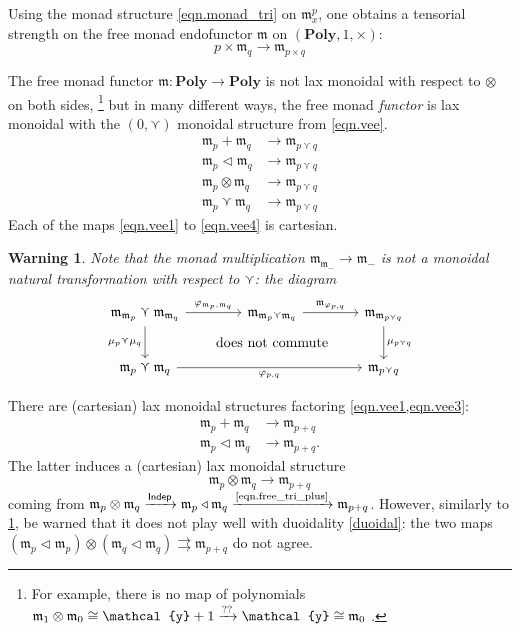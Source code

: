 \documentclass[11pt, one side, article]{memoir}
\theoremstyle{definition}
\theoremstyle{plain}
\newtheorem{warning}[definitionx]{Warning}
\newcommand{\Cat}[1]{\mathbf{#1}}%
\newcommand{\Fun}[1]{\mathsf{#1}}%
\newcommand{\tto}{\rightrightarrows}
\newcommand{\To}[2][]{\xrightarrow[#1]{\tn{$#2$}}}
\newcommand{\tn}[1]{\textnormal{#1}}
\newcommand{\yon}{{\mathcal{y}}}
\newcommand{\poly}{\Cat{Poly}}
\newcommand{\0}{\textsf{0}}
\newcommand{\1}{\tn{\textsf{1}}}
\newcommand{\tri}{\mathbin{\triangleleft}}
\newcommand{\indep}{\Fun{Indep}}
\newcommand{\free}{\mathfrak{m}}
\newcommand{\OR}{\curlyvee}
\begin{document}
Using the monad structure \eqref{eqn.monad_tri} on $\free_x^p$, one obtains a tensorial strength on the free monad endofunctor $\free$ on $(\poly,1,\times)$:
\begin{equation}\label{eqn.p_action_free}
	p\times\free_q\to\free_{p\times q}
\end{equation}

The free monad functor $\free\colon\poly\to\poly$ is not lax monoidal with respect to $\otimes$ on both sides,%
\footnote{For example, there is no map of polynomials 
$
  \free_1\otimes\free_0\cong\yon+1
  \To{??}
  \yon\cong\free_0\
$.
}
but in many different ways, the free monad \emph{functor} is lax monoidal with the $(0,\OR)$ monoidal structure from \eqref{eqn.vee}.
\begin{align}
\label{eqn.vee1}
	\free_p+\free_q&\to\free_{p\OR q}\\
\label{eqn.vee3}
	\free_p\tri\free_q&\to\free_{p\OR q}\\
\label{eqn.vee2}
	\free_p\otimes\free_q&\to\free_{p\OR q}\\
\label{eqn.vee4}
	\free_p\OR\free_q&\to\free_{p\OR q}
\end{align}
Each of the maps \eqref{eqn.vee1} to \eqref{eqn.vee4} is cartesian.

\begin{warning}\label{warn.noncommutative}
Note that the monad multiplication $\free_{\free_-}\to\free_-$ is \emph{not} a monoidal natural transformation with respect to $\OR$: the diagram
\begin{equation}
\begin{tikzcd}[column sep=40pt, row sep=23pt]
	\free_{\free_p}\OR\free_{\free_q}\ar[r, "\varphi_{\free_p,\free_q}"]\ar[d,"\mu_p\OR\mu_q"']&
	\free_{\free_p\OR\free_q}\ar[r, "\free_{\varphi_{p,q}}"]&
	\free_{\free_{p\OR q}}\ar[d, "\mu_{p\OR q}"]\\
	\free_p\OR\free_q\ar[rr, "\varphi_{p,q}"']&\ar[u, phantom, pos=.6, "\text{does not commute}"]&
	\free_{p\OR q}
\end{tikzcd}
\end{equation}
\end{warning}

There are (cartesian) lax monoidal structures factoring \cref{eqn.vee1,eqn.vee3}:
\begin{align}
	\free_p+\free_q&\to\free_{p+q}\\\label{eqn.free_tri_plus}
	\free_p\tri\free_q&\to\free_{p+q}.
\end{align}
The latter induces a (cartesian) lax monoidal structure
\begin{equation}
	\free_p\otimes\free_q\to\free_{p+q}\label{eqn.free_plus_otimes}
\end{equation}
coming from $\free_p\otimes\free_q\To{\indep} \free_p\tri \free_q\To{\eqref{eqn.free_tri_plus}} \free_{p+q}$. However, similarly to \cref{warn.noncommutative}, be warned that it does not play well with duoidality \eqref{duoidal}: the two maps $(\free_p\tri\free_p)\otimes(\free_q\tri\free_q)\tto\free_{p+q}$ do not agree.
\end{document}

